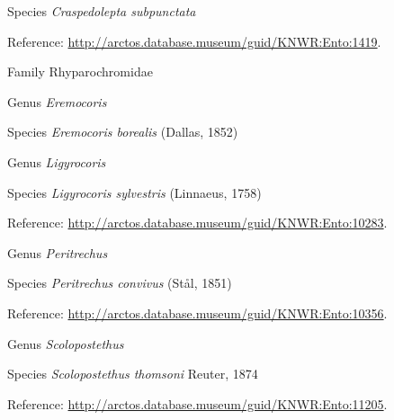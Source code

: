\documentclass[9pt, article]{memoir}
\begin{document}
\begin{multicols}{2}
\vspace{6pt}\noindent\hspace{36pt}Species \textit{Craspedolepta subpunctata}


\vspace{6pt}Reference: 
\url{http://arctos.database.museum/guid/KNWR:Ento:1419}.

\vspace{6pt}\noindent\hspace{24pt}Family Rhyparochromidae


\vspace{6pt}\noindent\hspace{30pt}Genus \textit{Eremocoris}


\vspace{6pt}\noindent\hspace{36pt}Species \textit{Eremocoris borealis} (Dallas, 1852)


\vspace{6pt}\noindent\hspace{30pt}Genus \textit{Ligyrocoris}


\vspace{6pt}\noindent\hspace{36pt}Species \textit{Ligyrocoris sylvestris} (Linnaeus, 1758)


\vspace{6pt}Reference: 
\url{http://arctos.database.museum/guid/KNWR:Ento:10283}.

\vspace{6pt}\noindent\hspace{30pt}Genus \textit{Peritrechus}


\vspace{6pt}\noindent\hspace{36pt}Species \textit{Peritrechus convivus} (Stål, 1851)


\vspace{6pt}Reference: 
\url{http://arctos.database.museum/guid/KNWR:Ento:10356}.

\vspace{6pt}\noindent\hspace{30pt}Genus \textit{Scolopostethus}


\vspace{6pt}\noindent\hspace{36pt}Species \textit{Scolopostethus thomsoni} Reuter, 1874


\vspace{6pt}Reference: 
\url{http://arctos.database.museum/guid/KNWR:Ento:11205}.


\end{multicols}
\end{document}
